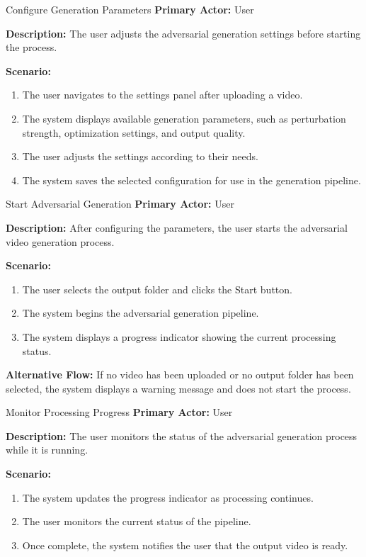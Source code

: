 \begin{usecase}{Configure Generation Parameters}
    \textbf{Primary Actor:} User

    \textbf{Description:} The user adjusts the adversarial
    generation settings before starting the process.

    \textbf{Scenario:}
    \begin{enumerate}[leftmargin=80pt]
        \item The user navigates to the settings panel after
        uploading a video.
        \item The system displays available generation parameters,
        such as perturbation strength, optimization settings,
        and output quality.
        \item The user adjusts the settings according to their needs.
        \item The system saves the selected configuration for use
        in the generation pipeline.
    \end{enumerate}
\end{usecase}

\begin{usecase}{Start Adversarial Generation}
    \textbf{Primary Actor:} User

    \textbf{Description:} After configuring the parameters,
    the user starts the adversarial video generation process.

    \textbf{Scenario:}
    \begin{enumerate}[leftmargin=80pt]
        \item The user selects the output folder and clicks
        the Start button.
        \item The system begins the adversarial generation pipeline.
        \item The system displays a progress indicator showing
        the current processing status.
    \end{enumerate}
    \textbf{Alternative Flow:} If no video has been uploaded
    or no output folder has been selected, the system displays
    a warning message and does not start the process.
\end{usecase}

\begin{usecase}{Monitor Processing Progress}
    \textbf{Primary Actor:} User

    \textbf{Description:} The user monitors the status of
    the adversarial generation process while it is running.

    \textbf{Scenario:}
    \begin{enumerate}[leftmargin=80pt]
        \item The system updates the progress indicator as
        processing continues.
        \item The user monitors the current status of the pipeline.
        \item Once complete, the system notifies the user
        that the output video is ready.
    \end{enumerate}
\end{usecase}

